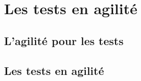 \chapter{Les tests en agilité}
\section{L'agilité pour les tests}
\label{sec:agiletest}
\section{Les tests en agilité}
\label{sec:testagile}
